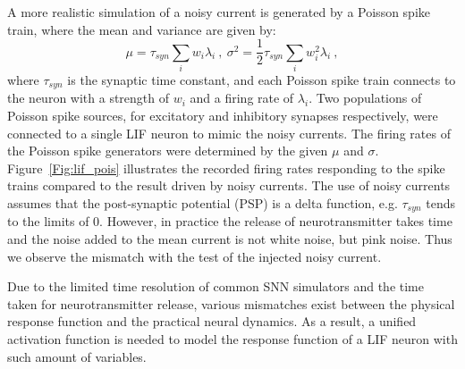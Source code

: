 	A more realistic simulation of a noisy current is generated by a Poisson spike train, 
	where the mean and variance are given by:
	\begin{equation}
	\mu = \tau_{syn}\sum_i w_i\lambda_{i}~,~\sigma^2=\frac{1}{2}\tau_{syn}\sum_i w_i^2\lambda_{i}~,
	\label{equ:distr}
	\end{equation}
	where $\tau_{syn}$ is the synaptic time constant, and each Poisson spike train connects to the neuron with a strength of $w_i$ and a firing rate of $\lambda_i$.
	Two populations of Poisson spike sources, for excitatory and inhibitory synapses respectively, were connected to a single LIF neuron to mimic the noisy currents.
	The firing rates of the Poisson spike generators were determined by the given $\mu$ and $\sigma$.
	Figure~\ref{Fig:lif_pois} illustrates the recorded firing rates responding to the spike trains compared to the result driven by noisy currents.
	The use of noisy currents assumes that the post-synaptic potential (PSP) is a delta function, e.g. $\tau_{syn}$ tends to the limits of 0.
	However, in practice the release of neurotransmitter takes time and the noise added to the mean current is not white noise, but pink noise.
	Thus we observe the mismatch with the test of the injected noisy current. %
	
	Due to the limited time resolution of common SNN simulators and the time taken for neurotransmitter release, various mismatches exist between the physical response function and the practical neural dynamics.
	As a result, a unified activation function is needed to model the response function of a LIF neuron with such amount of variables.

